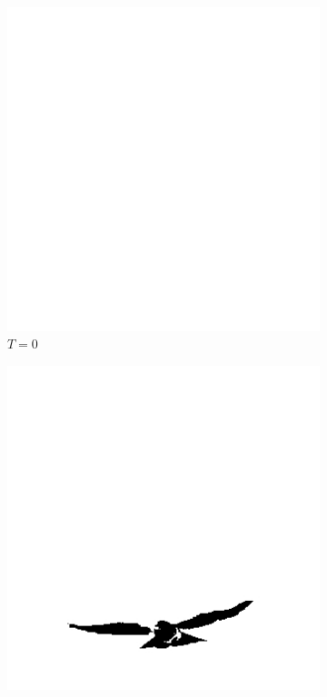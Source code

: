 \begin{figure}[H]
     \centering
     \begin{subfigure}[b]{0.3\textwidth}
         \centering
         \includegraphics[width=1\textwidth]{8Misc/Pictures/Introduction/img_threshold_p0.jpg}
         \caption{$T = 0$}
         \label{subfig:ThresholdExample2_p1}
     \end{subfigure}
     \hfill
     \begin{subfigure}[b]{0.3\textwidth}
         \centering
         \includegraphics[width=1\textwidth]{8Misc/Pictures/Introduction/img_threshold_p1.jpg}

\end{subfigure}
\end{figure}
